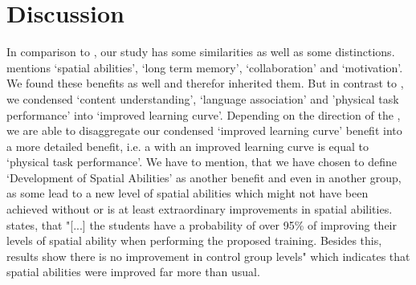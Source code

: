\section{Discussion}
\label{sec:Discussion}
In comparison to \cite{Radu.2014}, our study has some similarities as well as some distinctions. \cite{Radu.2014} mentions ‘spatial abilities’, ‘long term memory’, ‘collaboration’ and ‘motivation’. We found these benefits as well and therefor inherited them. But in contrast to \cite{Radu.2014}, we condensed ‘content understanding’, ‘language association’ and 'physical task performance’ into ‘improved learning curve’. Depending on the direction of the \appns, we are able to disaggregate our condensed ‘improved learning curve’ benefit into a more detailed benefit, i.e. a \ST \app with an improved learning curve is equal to ‘physical task performance’. We have to mention, that we have chosen to define ‘Development of Spatial Abilities' as another benefit and even in another group, as some \apps lead to a new level of spatial abilities which might not have been achieved without \AR or is at least extraordinary improvements in spatial abilities. \cite{MartinGutierrez.2013} states, that "[...] the students have a probability of over 95\% of improving their levels of spatial ability when performing the proposed training. Besides this, results show there is no improvement in control group levels"\autocite[4]{MartinGutierrez.2013} which indicates that spatial abilities were improved far more than usual. \\
%
